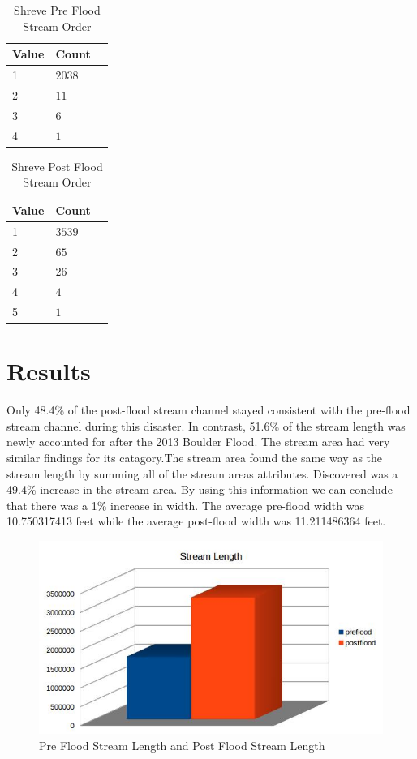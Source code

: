 \documentclass[twoside]{article}
\begin{document}
\begin{multicols}{2}
\begin{table}[H]
\caption{Shreve Pre Flood Stream Order}
\centering
\begin{tabular}{llr}
\cmidrule(r){1-2}
Value & Count \\
\midrule
1 & $2038$ \\
2 & $11$ \\
3 & $6$ \\
4 & $1$ \\
\bottomrule
\end{tabular}
\end{table}



\begin{table}[H]
\caption{Shreve Post Flood Stream Order}
\centering
\begin{tabular}{llr}
\cmidrule(r){1-2}
Value & Count \\
\midrule
1 & $3539$ \\
2 & $65$ \\
3 & $26$ \\
4 & $4$ \\
5 & $1$ \\
\bottomrule
\end{tabular}
\end{table}


\section{Results}
 
Only 48.4\% of the post-flood stream channel stayed consistent with the pre-flood stream channel during this disaster. In contrast, 51.6\% of the stream length was newly accounted for after the 2013 Boulder Flood. The stream area had very similar findings for its catagory.The stream area found the same way as the stream length by summing all of the stream areas attributes. Discovered was a 49.4\% increase in the stream area. By using this information we can conclude that there was a 1\% increase in width. The average pre-flood width was 10.750317413 feet while the average post-flood width was 11.211486364 feet. 
\begin{figure} %
\includegraphics[width=2\columnwidth, scale=2]{prevspostlength.jpg}
\caption{Pre Flood Stream Length and Post Flood Stream Length\label{fig:length}}
\end{figure}


\end{multicols}
\end{document}
